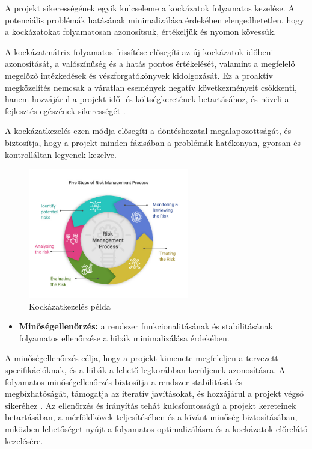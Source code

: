 A projekt sikerességének egyik kulcseleme a kockázatok folyamatos kezelése.  
A potenciális problémák hatásának minimalizálása érdekében elengedhetetlen, hogy a kockázatokat folyamatosan azonosítsuk, értékeljük és nyomon kövessük.  

A kockázatmátrix folyamatos frissítése elősegíti az új kockázatok időbeni azonosítását, 
a valószínűség és a hatás pontos értékelését, valamint a megfelelő megelőző intézkedések és vészforgatókönyvek kidolgozását.
Ez a proaktív megközelítés nemcsak a váratlan események negatív következményeit csökkenti,  
hanem hozzájárul a projekt idő- és költségkeretének betartásához, és növeli a fejlesztés egészének sikerességét \cite{Hajdu2014,Szalay2018}.  

A kockázatkezelés ezen módja elősegíti a döntéshozatal megalapozottságát,  
és biztosítja, hogy a projekt minden fázisában a problémák hatékonyan, gyorsan és kontrolláltan legyenek kezelve.

\begin{figure}[H]
    \centering
    \includegraphics[width=70mm, keepaspectratio]{figures/risk.jpg}
    \caption{Kockázatkezelés példa}
    \label{fig:risk}
\end{figure}

\begin{itemize}
    \item \textbf{Minőségellenőrzés:} a rendszer funkcionalitásának és stabilitásának folyamatos ellenőrzése a hibák minimalizálása érdekében.
\end{itemize}

A minőségellenőrzés célja, hogy a projekt kimenete megfeleljen a tervezett specifikációknak, és a hibák a lehető 
legkorábban kerüljenek azonosításra. A folyamatos minőségellenőrzés biztosítja a rendszer 
stabilitását és megbízhatóságát, támogatja az iteratív javításokat, és hozzájárul a projekt végső sikeréhez \cite{Kovacs2016,Kaposi2019,Szalay2018}.
Az ellenőrzés és irányítás tehát kulcsfontosságú a projekt kereteinek betartásában, a mérföldkövek teljesítésében és a 
kívánt minőség biztosításában, miközben lehetőséget nyújt a folyamatos optimalizálásra és a kockázatok előrelátó kezelésére.


